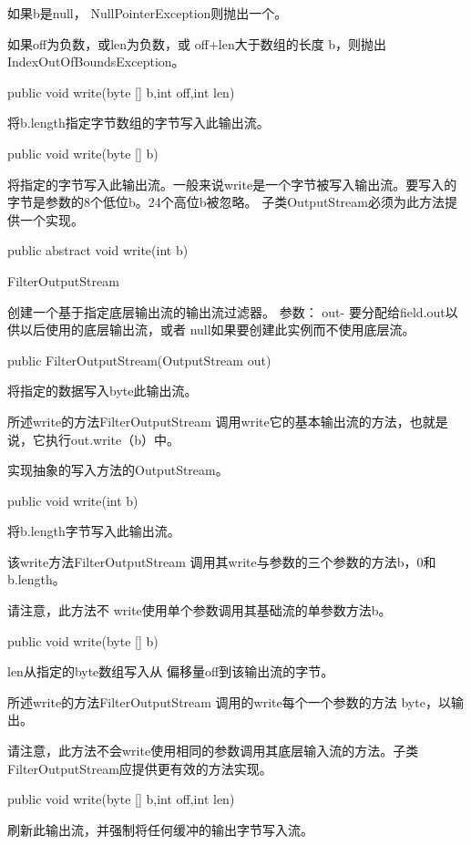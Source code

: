 如果b是null， NullPointerException则抛出一个。

如果off为负数，或len为负数，或 off+len大于数组的长度 b，则抛出IndexOutOfBoundsException。
\begin{java}
public void write(byte [] b,int off,int len)
\end{java}
将b.length指定字节数组的字节写入此输出流。
\begin{java}
public void write(byte [] b)
\end{java}
将指定的字节写入此输出流。一般来说write是一个字节被写入输出流。要写入的字节是参数的8个低位b。24个高位b被忽略。
子类OutputStream必须为此方法提供一个实现。
\begin{java}
public abstract void write(int b)
\end{java}

FilterOutputStream

创建一个基于指定底层输出流的输出流过滤器。
参数：
out- 要分配给field.out以供以后使用的底层输出流，或者 null如果要创建此实例而不使用底层流。
\begin{java}
public FilterOutputStream(OutputStream  out)
\end{java}
将指定的数据写入byte此输出流。

所述write的方法FilterOutputStream 调用write它的基本输出流的方法，也就是说，它执行out.write（b）中。

实现抽象的写入方法的OutputStream。

\begin{java}
public void write(int b)
\end{java}
将b.length字节写入此输出流。

该write方法FilterOutputStream 调用其write与参数的三个参数的方法b，0和 b.length。

请注意，此方法不 write使用单个参数调用其基础流的单参数方法b。
\begin{java}
public void write(byte [] b)
\end{java}
len从指定的byte数组写入从 偏移量off到该输出流的字节。

所述write的方法FilterOutputStream 调用的write每个一个参数的方法 byte，以输出。

请注意，此方法不会write使用相同的参数调用其底层输入流的方法。子类FilterOutputStream应提供更有效的方法实现。

\begin{java}
public void write(byte [] b,int off,int len)
\end{java}

刷新此输出流，并强制将任何缓冲的输出字节写入流。

